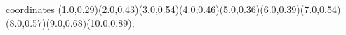					coordinates { (1.0,0.29)(2.0,0.43)(3.0,0.54)(4.0,0.46)(5.0,0.36)(6.0,0.39)(7.0,0.54)(8.0,0.57)(9.0,0.68)(10.0,0.89)};